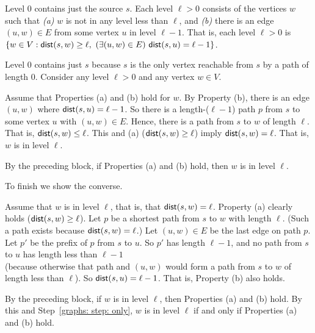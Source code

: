 \documentclass[11pt]{article}
\begin{document}
\begin{restatement}
\begin{lemma}[levels]\label{graphs: lemma: levels}
  Level 0 contains just the source $s$. 
  Each level $\ell>0$ consists of the vertices $w$ such that
  \emph{(a)} $w$ is not in any level less than $\ell$, and
  \emph{(b)} there is an edge $(u, w)\in E$ from some vertex $u$ in level $\ell-1$.
  That is, each level $\ell>0$ is $\{w\in V: \operatorname{\sf dist}(s, w) \ge \ell,~(\exists (u,w)\in E)\,\operatorname{\sf dist}(s, u) = \ell-1\}$.
\end{lemma}
\end{restatement}
\begin{longFormProof}%
  \step Level 0 contains just $s$ because $s$ is the only vertex reachable from $s$ by a path of length 0.
  \step Consider any level $\ell>0$ and any vertex $w\in V$.
  \begin{block}
    \step Assume that Properties (a) and (b) hold for $w$.
    \step By Property (b), there is an edge $(u,w)$ where $\operatorname{\sf dist}(s, u) = \ell-1$.
    \step So there is a length-($\ell-1$) path $p$ from $s$ to some vertex $u$ with $(u,w)\in E$.
    \step Hence, there is a path from $s$ to $w$ of length $\ell$.  That is, $\operatorname{\sf dist}(s, w) \le \ell$.
    \step This and (a) ($\operatorname{\sf dist}(s, w) \ge \ell$) imply $\operatorname{\sf dist}(s, w) = \ell$.  That is, $w$ is in level $\ell$.
  \end{block}
  \step\label{graphs: step: only}
  By the preceding block, if Properties (a) and (b) hold, then $w$ is in level $\ell$. 

  \step To finish we show the converse.
  \begin{block}
    \step Assume that $w$ is in level $\ell$, that is, that $\operatorname{\sf dist}(s, w) = \ell$.
    Property (a) clearly holds ($\operatorname{\sf dist}(s, w) \ge \ell$).
    \step Let $p$ be a shortest path from $s$ to $w$ with length $\ell$.  (Such a path exists because $\operatorname{\sf dist}(s, w) = \ell$.)
    \step Let $(u,w)\in E$ be the last edge on path $p$.   Let $p'$ be the prefix of $p$ from $s$ to $u$.
    \step So $p'$ has length $\ell-1$, and no path from $s$ to $u$ has length less than $\ell-1$
    \\(because otherwise that path and $(u,w)$ would form a path from $s$ to $w$ of length less than $\ell$).
    \step So $\operatorname{\sf dist}(s, u) = \ell-1$.  That is, Property (b) also holds. 
  \end{block}
  \step By the preceding block, if $w$ is in level $\ell$, then Properties (a) and (b) hold.
  \step By this and Step~\ref{graphs: step: only}, $w$ is in level $\ell$ if and only if Properties (a) and (b) hold.
\end{longFormProof}
\end{document}
